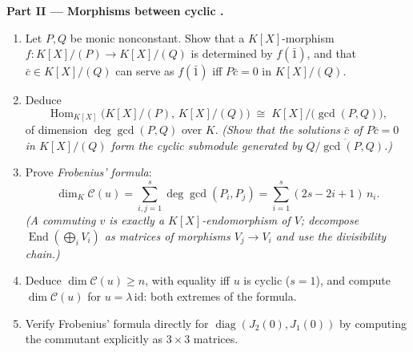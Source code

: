 \begin{problem}
\medskip
\noindent\textbf{Part II --- Morphisms between cyclic .}
\begin{enumerate}[resume]
  \item Let $P, Q$ be monic nonconstant. Show that a
        $K[X]$-morphism $f \colon K[X]/(P) \to K[X]/(Q)$ is
        determined by $f(\bar 1)$, and that $\bar c \in K[X]/(Q)$
        can serve as $f(\bar 1)$ iff $P\bar c = 0$ in $K[X]/(Q)$.
  \item Deduce
        \[
        \operatorname{Hom}_{K[X]}\bigl(K[X]/(P),\, K[X]/(Q)\bigr)
        \;\cong\; K[X]\big/\bigl(\gcd(P, Q)\bigr),
        \]
        of dimension $\deg \gcd(P, Q)$ over $K$. \emph{(Show that
        the solutions $\bar c$ of $P\bar c = 0$ in $K[X]/(Q)$
        form the cyclic submodule generated by
        $\overline{Q/\gcd(P,Q)}$.)}
  \item Prove \emph{Frobenius' formula}:
        \[
        \dim_K \mathcal C(u) = \sum_{i,j=1}^{s} \deg\gcd(P_i,
        P_j) = \sum_{i=1}^{s} (2s - 2i + 1)\, n_i .
        \]
        \emph{(A commuting $v$ is exactly a $K[X]$-endomorphism of
        $V$; decompose $\operatorname{End}(\bigoplus_i V_i)$ as
        matrices of morphisms $V_j \to V_i$ and use the
        divisibility chain.)}
  \item Deduce $\dim \mathcal C(u) \geq n$, with equality iff $u$
        is cyclic ($s = 1$), and compute $\dim\mathcal C(u)$ for
        $u = \lambda\,\mathrm{id}$: both extremes of the formula.
  \item Verify Frobenius' formula directly for
        $\operatorname{diag}(J_2(0), J_1(0))$ by computing the
        commutant explicitly as $3\times3$ matrices.
\end{enumerate}


\end{problem}
